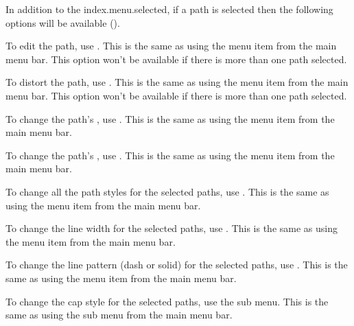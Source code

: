 In addition to the \gls{index.menu.selected},
if a path is selected then the following options will be available
().


To edit the path, use . This is the same as using
the  menu item from the main menu bar.
This option won't be available if there is more than one
path selected.


To distort the path, use . This is the same as using
the  menu item from the main menu bar.
This option won't be available if there is more than one
path selected.


To change the path's , use
. This is the same as using the
 menu item from the main menu bar.


To change the path's , use
. This is the same as using the
 menu item from the main menu bar.


To change all the path styles for the selected paths,
use . This is the same as using the
 menu item from the main menu bar.


To change the line width for the selected paths,
use . This is the same as using the
 menu item from the main menu bar.


To change the line pattern (dash or solid) for the selected paths,
use . This is the same as using the
 menu item from the main menu bar.


To change the cap style for the selected paths,
use the  sub menu. This is the same as using the
 sub menu from the main menu bar.

